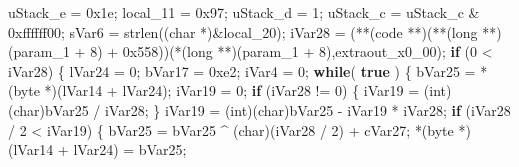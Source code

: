 \documentclass[
]{article}
\newenvironment{Shaded}{}{}
\newcommand{\BaseNTok}[1]{\textcolor[rgb]{0.25,0.63,0.44}{#1}}
\newcommand{\ControlFlowTok}[1]{\textcolor[rgb]{0.00,0.44,0.13}{\textbf{#1}}}
\newcommand{\DataTypeTok}[1]{\textcolor[rgb]{0.56,0.13,0.00}{#1}}
\newcommand{\DecValTok}[1]{\textcolor[rgb]{0.25,0.63,0.44}{#1}}
\newcommand{\KeywordTok}[1]{\textcolor[rgb]{0.00,0.44,0.13}{\textbf{#1}}}
\newcommand{\NormalTok}[1]{#1}
\newcommand{\OperatorTok}[1]{\textcolor[rgb]{0.40,0.40,0.40}{#1}}
\begin{document}
\begin{Shaded}
\begin{Highlighting}[]
\NormalTok{  uStack\_e }\OperatorTok{=} \BaseNTok{0x1e}\OperatorTok{;}
\NormalTok{  local\_11 }\OperatorTok{=} \BaseNTok{0x97}\OperatorTok{;}
\NormalTok{  uStack\_d }\OperatorTok{=} \DecValTok{1}\OperatorTok{;}
\NormalTok{  uStack\_c }\OperatorTok{=}\NormalTok{ uStack\_c }\OperatorTok{\&} \BaseNTok{0xffffff00}\OperatorTok{;}
\NormalTok{  sVar6 }\OperatorTok{=}\NormalTok{ strlen}\OperatorTok{((}\DataTypeTok{char} \OperatorTok{*)\&}\NormalTok{local\_20}\OperatorTok{);}
\NormalTok{  iVar28 }\OperatorTok{=} \OperatorTok{(**(}\NormalTok{code }\OperatorTok{**)(**(}\DataTypeTok{long} \OperatorTok{**)(}\NormalTok{param\_1 }\OperatorTok{+} \DecValTok{8}\OperatorTok{)} \OperatorTok{+} \BaseNTok{0x558}\OperatorTok{))(*(}\DataTypeTok{long} \OperatorTok{**)(}\NormalTok{param\_1 }\OperatorTok{+} \DecValTok{8}\OperatorTok{),}\NormalTok{extraout\_x0\_00}\OperatorTok{);}
  \ControlFlowTok{if} \OperatorTok{(}\DecValTok{0} \OperatorTok{\textless{}}\NormalTok{ iVar28}\OperatorTok{)} \OperatorTok{\{}
\NormalTok{    lVar24 }\OperatorTok{=} \DecValTok{0}\OperatorTok{;}
\NormalTok{    bVar17 }\OperatorTok{=} \BaseNTok{0xe2}\OperatorTok{;}
\NormalTok{    iVar4 }\OperatorTok{=} \DecValTok{0}\OperatorTok{;}
    \ControlFlowTok{while}\OperatorTok{(} \KeywordTok{true} \OperatorTok{)} \OperatorTok{\{}
\NormalTok{      bVar25 }\OperatorTok{=} \OperatorTok{*(}\NormalTok{byte }\OperatorTok{*)(}\NormalTok{lVar14 }\OperatorTok{+}\NormalTok{ lVar24}\OperatorTok{);}
\NormalTok{      iVar19 }\OperatorTok{=} \DecValTok{0}\OperatorTok{;}
      \ControlFlowTok{if} \OperatorTok{(}\NormalTok{iVar28 }\OperatorTok{!=} \DecValTok{0}\OperatorTok{)} \OperatorTok{\{}
\NormalTok{        iVar19 }\OperatorTok{=} \OperatorTok{(}\DataTypeTok{int}\OperatorTok{)(}\DataTypeTok{char}\OperatorTok{)}\NormalTok{bVar25 }\OperatorTok{/}\NormalTok{ iVar28}\OperatorTok{;}
      \OperatorTok{\}}
\NormalTok{      iVar19 }\OperatorTok{=} \OperatorTok{(}\DataTypeTok{int}\OperatorTok{)(}\DataTypeTok{char}\OperatorTok{)}\NormalTok{bVar25 }\OperatorTok{{-}}\NormalTok{ iVar19 }\OperatorTok{*}\NormalTok{ iVar28}\OperatorTok{;}
      \ControlFlowTok{if} \OperatorTok{(}\NormalTok{iVar28 }\OperatorTok{/} \DecValTok{2} \OperatorTok{\textless{}}\NormalTok{ iVar19}\OperatorTok{)} \OperatorTok{\{}
\NormalTok{        bVar25 }\OperatorTok{=}\NormalTok{ bVar25 }\OperatorTok{\^{}} \OperatorTok{(}\DataTypeTok{char}\OperatorTok{)(}\NormalTok{iVar28 }\OperatorTok{/} \DecValTok{2}\OperatorTok{)} \OperatorTok{+}\NormalTok{ cVar27}\OperatorTok{;}
        \OperatorTok{*(}\NormalTok{byte }\OperatorTok{*)(}\NormalTok{lVar14 }\OperatorTok{+}\NormalTok{ lVar24}\OperatorTok{)} \OperatorTok{=}\NormalTok{ bVar25}\OperatorTok{;}

\end{Highlighting}
\end{Shaded}
\end{document}

